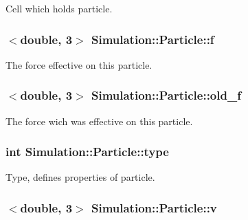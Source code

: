 Cell which holds particle. 

\hypertarget{classSimulation_1_1Particle_a54c7b7f1cb33876abdbd505d06c9b499}{
\subsubsection[{f}]{$<$double, 3$>$ Simulation\-::\-Particle\-::f\hspace{0.3cm}{\ttfamily [private]}}}\label{classSimulation_1_1Particle_a54c7b7f1cb33876abdbd505d06c9b499}


The force effective on this particle. 

\hypertarget{classSimulation_1_1Particle_a80cc4684069bff79cb7d91c25237141f}{
\subsubsection[{old\-\_\-f}]{$<$double, 3$>$ Simulation\-::\-Particle\-::old\-\_\-f\hspace{0.3cm}{\ttfamily [private]}}}\label{classSimulation_1_1Particle_a80cc4684069bff79cb7d91c25237141f}


The force wich was effective on this particle. 

\hypertarget{classSimulation_1_1Particle_aeb6388e2a21c03c7e1582eb4eeb5efb3}{
\subsubsection[{type}]{\setlength{\rightskip}{0pt plus 5cm}int Simulation\-::\-Particle\-::type\hspace{0.3cm}{\ttfamily [private]}}}\label{classSimulation_1_1Particle_aeb6388e2a21c03c7e1582eb4eeb5efb3}


Type, defines properties of particle. 

\hypertarget{classSimulation_1_1Particle_aedd9ec08978292732fc38dd6d93dc3b4}{
\subsubsection[{v}]{$<$double, 3$>$ Simulation\-::\-Particle\-::v\hspace{0.3cm}{\ttfamily [private]}}}\label{classSimulation_1_1Particle_aedd9ec08978292732fc38dd6d93dc3b4}


